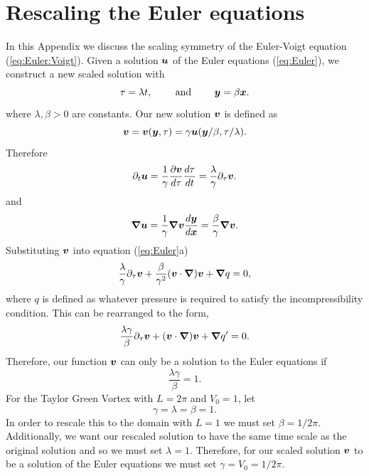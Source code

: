 \chapter{Rescaling the Euler equations}
\label{app:time:scale:euler}

In this Appendix we discuss the scaling symmetry of the Euler-Voigt equation (\ref{eq:Euler:Voigt}). Given a solution $\boldsymbol u$ of the Euler equations (\ref{eq:Euler}), we construct a new scaled solution with
$$\tau = \lambda t, \qquad \text{ and }\qquad \boldsymbol y = \beta\boldsymbol x.$$ 
where $\lambda, \beta > 0$ are constants. Our new solution $\boldsymbol v$ is defined as
$$\boldsymbol v = \boldsymbol v(\boldsymbol y,\tau) = \gamma \boldsymbol u(\boldsymbol y/\beta, \tau/\lambda).$$
Therefore
$$\partial_t \boldsymbol u = \frac{1}{\gamma}\frac{\partial \boldsymbol v}{d\tau}\frac{d\tau}{dt} = \frac{\lambda}{\gamma} \partial_\tau \boldsymbol v.$$
and
$${\boldsymbol \nabla} \boldsymbol u = \frac{1}{\gamma}{\boldsymbol \nabla} \boldsymbol v \frac{d\boldsymbol y}{d\boldsymbol x} = \frac{\beta}{\gamma}{\boldsymbol \nabla} \boldsymbol v.$$
Substituting $\boldsymbol v$ into equation (\ref{eq:Euler}a)
$$\frac{\lambda}{\gamma} \partial_\tau \boldsymbol v + \frac{\beta}{\gamma^2}(\boldsymbol v\cdot{\boldsymbol \nabla})\boldsymbol v + {\boldsymbol \nabla} q = 0,$$
where $q$ is defined as whatever pressure is required to satisfy the incompressibility condition. This can be rearranged to the form,
$$\frac{\lambda\gamma}{\beta} \partial_\tau \boldsymbol v + (\boldsymbol v\cdot{\boldsymbol \nabla})\boldsymbol v + {\boldsymbol \nabla} q' = 0.$$
Therefore, our function $\boldsymbol v$ can only be a solution to the Euler equations if
$$\frac{\lambda\gamma}{\beta} = 1.$$
For the Taylor Green Vortex with $L = 2\pi$ and $V_0 = 1$, let 
$$\gamma = \lambda = \beta = 1.$$
In order to rescale this to the domain with $L=1$ we must set $\beta = 1/2\pi$. Additionally, we want our rescaled solution to have the same time scale as the original solution and so we must set $\lambda = 1$. Therefore, for our scaled solution $\boldsymbol v$ to be a solution of the Euler equations we must set $\gamma = V_0 = 1/2\pi$. 